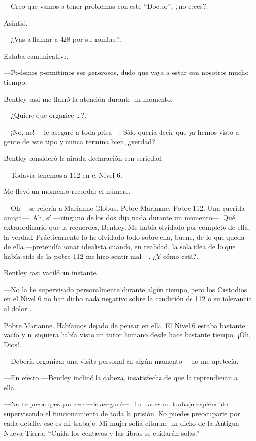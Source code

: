 ---Creo que vamos a tener problemas con este ``Doctor'', ¿no crees?.

Asintió.

---¿Vas a llamar a 428 por su nombre?.

Estaba comunicativo. ~

---Podemos permitirnos ser generosos, dudo que vaya a estar con nosotros
mucho tiempo.

Bentley casi me llamó la atención durante un momento.

---¿Quiere que organice \ldots{}?.

---¡No, no! ---le aseguré a toda prisa---. Sólo quería decir que ya
hemos visto a gente de este tipo y nunca termina bien, ¿verdad?.

Bentley consideró la airada declaración con seriedad.

---Todavía tenemos a 112 en el Nivel 6.

Me llevó un momento recordar el número.

---Oh ---se refería a Marianne Globus. Pobre Marianne. Pobre 112. Una
querida amiga---. Ah, sí ---ninguno de los dos dijo nada durante un
momento---. Qué extraordinario que la recuerdes, Bentley. Me había
olvidado por completo de ella, la verdad. Prácticamente lo he olvidado
todo sobre ella, bueno, de lo que queda de ella ---pretendía sonar
idealista cuando, en realidad, la sola idea de lo que había sido de la
pobre 112 me hizo sentir mal---. ¿Y cómo está?.

Bentley casi vaciló un instante.

---No la he supervisado personalmente durante algún tiempo, pero los
Custodios en el Nivel 6 no han dicho nada negativo sobre la condición de
112 o su tolerancia al dolor .

Pobre Marianne. Habíamos dejado de pensar en ella. El Nivel 6 estaba
bastante vacío y ni siquiera había visto un tutor humano desde hace
bastante tiempo. ¡Oh, Dios!.

---Debería organizar una visita personal en algún momento ---no me
apetecía.

---En efecto ---Bentley inclinó la cabeza, insatisfecha de que la
reprendieran a ella.

---No te preocupes por eso ---le aseguré---. Tu haces un trabajo
espléndido supervisando el funcionamiento de toda la prisión. No puedes
preocuparte por cada detalle, ése es mi trabajo. Mi mujer solía citarme
un dicho de la Antigua Nueva Tierra: ``Cuida los centavos y las libras
se cuidarán solas.''

